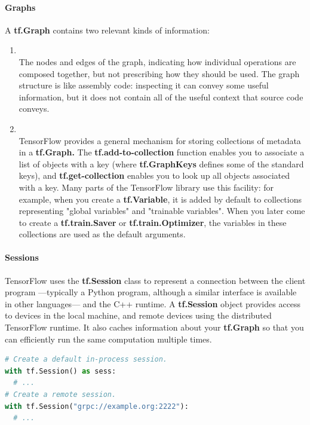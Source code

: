 \paragraph{Graphs}
A \textbf{tf.Graph} contains two relevant kinds of information:
\begin{enumerate}
      \item\textcite{Graph structure}\\
      The nodes and edges of the graph, indicating how individual operations are composed together, but not prescribing how they should be used. The graph structure is like assembly code: inspecting it can convey some useful information, but it does not contain all of the useful context that source code conveys.
      
      \item\textcite{Graph collections}\\
      TensorFlow provides a general mechanism for storing collections of metadata in a \textbf{tf.Graph.} The \textbf{tf.add-to-collection} function enables you to associate a list of objects with a key (where \textbf{tf.GraphKeys} defines some of the standard keys), and \textbf{tf.get-collection} enables you to look up all objects associated with a key. Many parts of the TensorFlow library use this facility: for example, when you create a \textbf{tf.Variable}, it is added by default to collections representing "global variables" and "trainable variables". When you later come to create a \textbf{tf.train.Saver} or \textbf{tf.train.Optimizer}, the variables in these collections are used as the default arguments.
      
\end{enumerate}

\paragraph{Sessions}
    TensorFlow uses the \textbf{tf.Session} class to represent a connection between the client program ---typically a Python program, although a similar interface is available in other languages--- and the C++ runtime. A \textbf{tf.Session} object provides access to devices in the local machine, and remote devices using the distributed TensorFlow runtime. It also caches information about your \textbf{tf.Graph} so that you can efficiently run the same computation multiple times.\\
    \begin{lstlisting}[language=Python]
# Create a default in-process session.
with tf.Session() as sess:
  # ...
# Create a remote session.
with tf.Session("grpc://example.org:2222"):
  # ...

\end{lstlisting}

